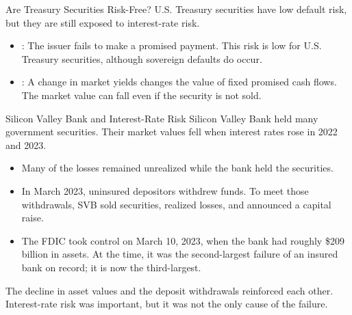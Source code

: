 \documentclass[aspectratio=169,11pt]{beamer}
\begin{document}

\begin{frame}{Are Treasury Securities Risk-Free?}
  \vspace{0.3em}
   U.S. Treasury securities have low default risk, but they
  are still exposed to interest-rate risk.

  \vspace{0.45em}
  \begin{itemize}\setlength{\itemsep}{0.45em}
    \item {}: The issuer fails to make a promised payment.
      This risk is low for U.S. Treasury securities, although sovereign defaults
      do occur.
    \item {}: A change in market yields changes the
      value of fixed promised cash flows. The market value can fall even if the
      security is not sold.
  \end{itemize}

\end{frame}

\begin{frame}{Silicon Valley Bank and Interest-Rate Risk}
  \vspace{0.1em}
  Silicon Valley Bank held many  government
  securities. Their market values fell when interest rates rose in 2022 and
  2023.

  \vspace{0.3em}
  \begin{itemize}\setlength{\itemsep}{0.3em}
    \item Many of the losses remained unrealized while the bank held the
      securities.
    \item In March 2023, uninsured depositors withdrew funds. To meet those
      withdrawals, SVB sold securities, realized losses, and announced a capital
      raise.
    \item The FDIC took control on March 10, 2023, when the bank had roughly
      \$209 billion in assets. At the time, it was the second-largest failure of
      an insured bank on record; it is now the third-largest.
  \end{itemize}

  \vspace{0.15em}
  The decline in asset values and the deposit withdrawals reinforced each
  other. Interest-rate risk was important, but it was not the only cause of the
  failure.

\end{frame}
\end{document}
